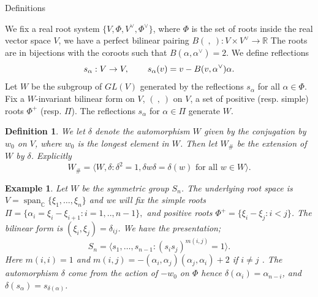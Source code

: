 \documentclass[a4paper,10pt]{amsart}
\newtheorem{definition}[theorem]{Definition}
\newtheorem{example}[theorem]{Example}
\DeclareMathOperator{\Span}{span}
\begin{document}
\begin{section}{Definitions} 

We fix a real root system $\{V, \Phi, V^\vee, \Phi^\vee\}$, where $\Phi$ is the set of roots inside the real vector space $
V$, we have a perfect bilinear pairing $B( \ , \ ) : V \times V^\vee \to \mathbb{R}$ The roots are in bijections with the coroots such that $B( \alpha , \alpha^\vee ) = 2$. We define reflections $$s_\alpha : V \to V, \hspace{0.75cm} s_\alpha (v) = v - B( v, \alpha^\vee  )\alpha.$$ Let $W$ be the subgroup of $GL(V)$ generated by the reflections $s_\alpha$ for all $\alpha \in \Phi$.
Fix a $W$-invariant bilinear form on $V$, $( \ , \ )$ on $V$, a set of positive (resp. simple) roots $\Phi^+$ (resp. $\Pi$). The reflections $s_\alpha$ for $\alpha \in \Pi$ generate $W$. 





\begin{definition} We let $\delta$ denote the automorphism $W$ given by the conjugation by $w_0$ on $V$, where $w_0$ is the longest element in $W$. Then let $W_\#$ be the extension of $W$ by $\delta$. Explicitly $$W_\# = \langle W , \delta : \delta^2 = 1, \delta w \delta = \delta(w) \text{ for all } w \in W \rangle.$$
\end{definition} 

\begin{example} Let $W$ be the symmetric group $S_n$. 
The underlying root space is $V = \Span_{\mathbb{C}} \{\xi_1,\ldots ,\xi_n\}$ and we will fix the simple roots $\Pi = \{\alpha_i =\xi_i-\xi_{i+1} : i = 1,..,n-1\},$ and positive roots $\Phi^+ = \{\xi_i-\xi_j : i <j \}$. The bilinear form is $( \xi_i , \xi_j ) = \delta_{ij}$. We have the presentation;
 $$S_n = \langle s_1,\ldots ,s_{n-1} : (s_is_j)^{m(i,j)} = 1 \rangle.$$
Here  $m(i,i) = 1$ and $m(i,j) = -( \alpha_i , \alpha_j )( \alpha_j , \alpha_i ) +2$ if $i\neq j$ \cite{M74}. The automorphism $\delta$ come from the action of $-w_0$ on $\Phi$ hence $\delta(\alpha_i) = \alpha_{n-i}$, and $\delta(s_\alpha) = s_{\delta(\alpha)}$.\end{example} 



\end{section}
\end{document}
